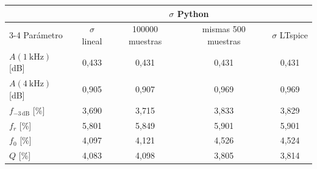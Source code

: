 \begin{tabular}{@{}lcccc@{}}
\toprule
& & \multicolumn{2}{c}{$\sigma$ Python} & \\ \cmidrule(lr){3-4} Parámetro & $\sigma$ lineal & \num{100000} muestras & mismas \num{500} muestras & $\sigma$ LTspice \\
\midrule
$A(\qty{1}{\kilo\hertz})$ [dB] & 0{,}433 & 0{,}431 & 0{,}431 & 0{,}431 \\
$A(\qty{4}{\kilo\hertz})$ [dB] & 0{,}905 & 0{,}907 & 0{,}969 & 0{,}969 \\
$f_{-3\,\text{dB}}$ [\%] & 3{,}690 & 3{,}715 & 3{,}833 & 3{,}829 \\
$f_r$ [\%] & 5{,}801 & 5{,}849 & 5{,}901 & 5{,}901 \\
$f_0$ [\%] & 4{,}097 & 4{,}121 & 4{,}526 & 4{,}524 \\
$Q$ [\%] & 4{,}083 & 4{,}098 & 3{,}805 & 3{,}814 \\
\bottomrule
\end{tabular}
